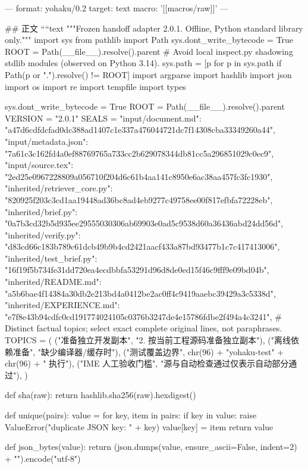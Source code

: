 ---
format: yohaku/0.2
target: text
macro: '[[macros/raw]]'
---

## 正文
````text
"""Frozen handoff adapter 2.0.1. Offline, Python standard library only."""
import sys
from pathlib import Path
sys.dont_write_bytecode = True
ROOT = Path(__file__).resolve().parent
# Avoid local inspect.py shadowing stdlib modules (observed on Python 3.14).
sys.path = [p for p in sys.path if Path(p or ".").resolve() != ROOT]
import argparse
import hashlib
import json
import os
import re
import tempfile
import types

sys.dont_write_bytecode = True
ROOT = Path(__file__).resolve().parent
VERSION = "2.0.1"
SEALS = {
    "input/document.md": "a47d6cdfdcfad0dc388ad1407c1e337a476044721dc7f14308cba33349260a44",
    "input/metadata.json": "7a61c3c162fd4a0ef88769765a733cc2b629078344db81cc5a296851029c0ec9",
    "input/source.tex": "2ed25e0967228809a056710f204d6c61b4aa141c8950e6ac38aa457fc3fc1930",
    "inherited/retriever_core.py": "820925f203c3cd1aa19448ad36bc8ad4eb9277c49758ee00f817efbfa72228eb",
    "inherited/brief.py": "0a7b3cd32b5d935ee29555030306ab69903e0ad5c9538d60a36436abd24dd56d",
    "inherited/verify.py": "d83cd66c183b789c61dcb49b9b4cd2421aacf433a87bd93477b1c7c417413006",
    "inherited/test_brief.py": "16f19f5b734fe31dd720ea4ecdbbfa53291d96d8de0ed15f46c9fff9e09bd04b",
    "inherited/README.md": "a5b6bae4f14384a30db2e213bd4a0412be2ac0ff4c9419aaebc39429a3c5338d",
    "inherited/EXPERIENCE.md": "e7f8e43b94cdfc0cd191774024105c0376b3247de4e15786fdbe2f494a4c3241",
}
# Distinct factual topics; select exact complete original lines, not paraphrases.
TOPICS = (
    ("准备独立开发副本", "2. 按当前工程源码准备独立副本"),
    ("离线依赖准备", "缺少编译器/缓存时"),
    ("测试覆盖边界", chr(96) + "yohaku-test" + chr(96) + " 执行"),
    ("IME 人工验收门槛", "源与自动检查通过仅表示自动部分通过"),
)

def sha(raw):
    return hashlib.sha256(raw).hexdigest()

def unique(pairs):
    value = {}
    for key, item in pairs:
        if key in value:
            raise ValueError("duplicate JSON key: " + key)
        value[key] = item
    return value

def json_bytes(value):
    return (json.dumps(value, ensure_ascii=False, indent=2) + "\n").encode("utf-8")

